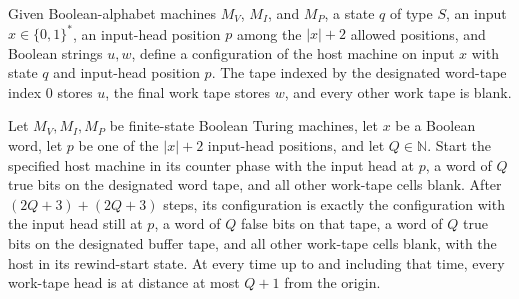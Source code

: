 \begin{definition}
\label{Complexity.b2b_setupCfg}
\leanok
{}
Given Boolean-alphabet machines $M_V$, $M_I$, and $M_P$, a state $q$ of type $S$, an
input $x\in\{0,1\}^*$, an input-head position $p$ among the $|x|+2$ allowed positions,
and Boolean strings $u,w$, define a configuration of the host machine on input $x$ with
state $q$ and input-head position $p$. The tape indexed by the designated word-tape
index $0$ stores $u$, the final work tape stores $w$, and every other work tape is
blank.
\end{definition}

\begin{theorem}
\label{Complexity.b2b_seed_run}
\leanok
{}
Let $M_V,M_I,M_P$ be finite-state Boolean Turing machines, let $x$ be a Boolean word,
let $p$ be one of the $|x|+2$ input-head positions, and let $Q\in\mathbb N$. Start the
specified host machine in its counter phase with the input head at $p$, a word of $Q$
true bits on the designated word tape, and all other work-tape cells blank. After
$(2Q+3)+(2Q+3)$ steps, its configuration is exactly the configuration with the input
head still at $p$, a word of $Q$ false bits on that tape, a word of $Q$ true bits on the
designated buffer tape, and all other work-tape cells blank, with the host in its
rewind-start state. At every time up to and including that time, every work-tape head is
at distance at most $Q+1$ from the origin.
\end{theorem}

